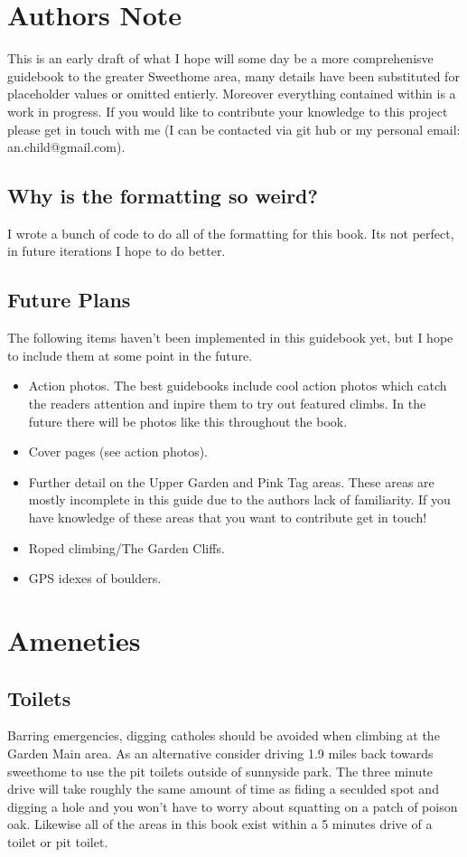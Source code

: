 \section{Authors Note}
This is an early draft of what I hope will some day be a more comprehenisve guidebook to the greater Sweethome area, many details have been substituted for placeholder values or omitted entierly. Moreover everything contained within is a work in progress. If you would like to contribute your knowledge to this project please get in touch with me (I can be contacted via git hub or my personal email: an.child@gmail.com).
\subsection*{Why is the formatting so weird?}
I wrote a bunch of code to do all of the formatting for this book. Its not perfect, in future iterations I hope to do better.
\subsection*{Future Plans}
The following items haven't been implemented in this guidebook yet, but I hope to include them at some point in the future.
\begin{itemize}
\item Action photos. The best guidebooks include cool action photos which catch the readers attention and inpire them to try out featured climbs. In the future there will be photos like this throughout the book.\\
\item Cover pages (see action photos).\\
\item Further detail on the Upper Garden and Pink Tag areas. These areas are mostly incomplete in this guide due to the authors lack of familiarity. If you have knowledge of these areas that you want to contribute get in touch!\\
\item Roped climbing/The Garden Cliffs.\\
\item GPS idexes of boulders.\\
\end{itemize}
\section{Ameneties}
\subsection*{Toilets}
Barring emergencies, digging catholes should be avoided when climbing at the Garden Main area. As an alternative consider driving 1.9 miles back towards sweethome to use the pit toilets outside of sunnyside park. The three minute drive will take roughly the same amount of time as fiding a seculded spot and digging a hole and you won't have to worry about squatting on a patch of poison oak. Likewise all of the areas in this book exist within a 5 minutes drive of a toilet or pit toilet. 
